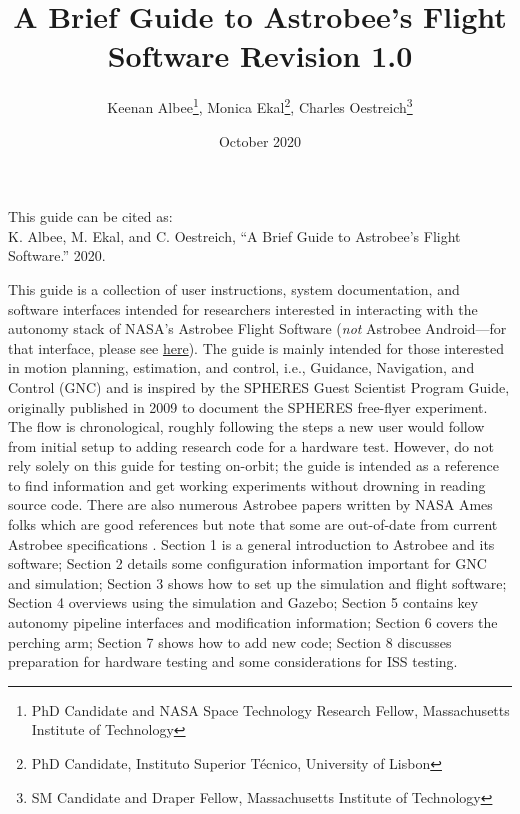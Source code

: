 \documentclass{article}
\begin{document}
\title{A Brief Guide to Astrobee's Flight Software
        \Large Revision 1.0 }
\author{Keenan Albee\footnote{PhD Candidate and NASA Space Technology Research Fellow, Massachusetts Institute of Technology}, Monica Ekal\footnote{PhD Candidate, Instituto Superior Técnico, University of Lisbon}, Charles Oestreich\footnote{SM Candidate and Draper Fellow, Massachusetts Institute of Technology}}
\date{October 2020}
\vspace{20cm}
\maketitle
\vfill
\begin{center}
This guide can be cited as:\\
K. Albee, M. Ekal, and C. Oestreich, “A Brief Guide to Astrobee’s Flight Software.” 2020.
\end{center}
\newpage
This guide is a collection of user instructions, system documentation, and software interfaces intended for researchers interested in interacting with the autonomy stack of NASA's Astrobee Flight Software (\textit{not} Astrobee Android---for that interface, please see \href{https://github.com/nasa/astrobee\_android}{here}). The guide is mainly intended for those interested in motion planning, estimation, and control, i.e., Guidance, Navigation, and Control (GNC) and is inspired by the SPHERES Guest Scientist Program Guide, originally published in 2009 to document the SPHERES free-flyer experiment. The flow is chronological, roughly following the steps a new user would follow from initial setup to adding research code for a hardware test. However, do not rely solely on this guide for testing on-orbit; the guide is intended as a reference to find information and get working experiments without drowning in reading source code. There are also numerous Astrobee papers written by NASA Ames folks which are good references but note that some are out-of-date from current Astrobee specifications \cite{Park2017a} \cite{Smith2016} \cite{Watterson2016} \cite{Fluckiger} \cite{Coltin2016a} \cite{Kim2017} \cite{Bualat2015} \cite{Lee2018}. Section 1 is a general introduction to Astrobee and its software; Section 2 details some configuration information important for GNC and simulation; Section 3 shows how to set up the simulation and flight software; Section 4 overviews using the simulation and Gazebo; Section 5 contains key autonomy pipeline interfaces and modification information; Section 6 covers the perching arm; Section 7 shows how to add new code; Section 8 discusses preparation for hardware testing and some considerations for ISS testing. 
\end{document}
